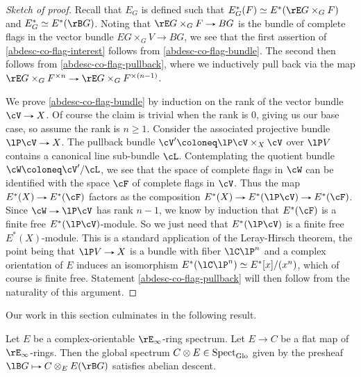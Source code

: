 \begin{proof}[Sketch of proof]
  Recall that $E_G$ is defined such that
  $E_G^*(F) \iso E^*(\rE G \times_G F)$ and $E_G^* \iso E^*(\rB G)$.
  Noting that $\rE G \times_G F \to BG$ is the bundle of complete
  flags in the vector bundle $EG \times_G V \to BG$, we see that the
  first assertion of \cref{abdesc-co-flag-interest} follows from
  \cref{abdesc-co-flag-bundle}. The second then follows from
  \cref{abdesc-co-flag-pullback}, where we inductively pull back via
  the map
  $\rE G \times_G F^{\times n} \to \rE G \times_G F^{\times(n-1)}$.

  We prove \cref{abdesc-co-flag-bundle} by induction on the rank of
  the vector bundle $\cV \to X$. Of course the claim is trivial when
  the rank is $0$, giving us our base case, so assume the rank is
  $n \ge 1$. Consider the associated projective bundle $\lP\cV \to X$.
  The pullback bundle $\cV' \ce \lP\cV \times_X \cV$ over $\lP V$
  contains a canonical line sub-bundle $\cL$. Contemplating the
  quotient bundle $\cW \ce \cV'/\cL$, we see that the space of
  complete flags in $\cW$ can be identified with the space $\cF$ of
  complete flags in $\cV$. Thus the map $E^*(X) \to E^*(\cF)$ factors
  as the composition $E^*(X) \to E^*(\lP\cV) \to E^*(\cF)$. Since
  $\cW \to \lP\cV$ has rank $n-1$, we know by induction that
  $E^*(\cF)$ is a finite free $E^*(\lP\cV)$-module. So we just need
  that $E^*(\lP\cV)$ is a finite free $E^*(X)$-module. This is a
  standard application of the Leray-Hirsch theorem, the point being
  that $\lP V \to X$ is a bundle with fiber $\lC\lP^n$ and a complex
  orientation of $E$ induces an isomorphism
  $E^*(\lC\lP^n) \iso E^*[x]/(x^n)$, which of course is finite
  free. Statement \cref{abdesc-co-flag-pullback} will then follow from
  the naturality of this argument.
\end{proof}

Our work in this section culminates in the following result.

\begin{proposition}
  \label{abdesc-main}
  Let $E$ be a complex-orientable $\rE_\infty$-ring spectrum. Let $E
  \to C$ be a flat map of $\rE_\infty$-rings. Then the global
  spectrum $C \otimes E \in \mathrm{Spect}_{\mathrm{Glo}}$ given by the presheaf $\lB G
  \mapsto C \otimes_E E(\rB G)$ satisfies abelian descent.
\end{proposition}

